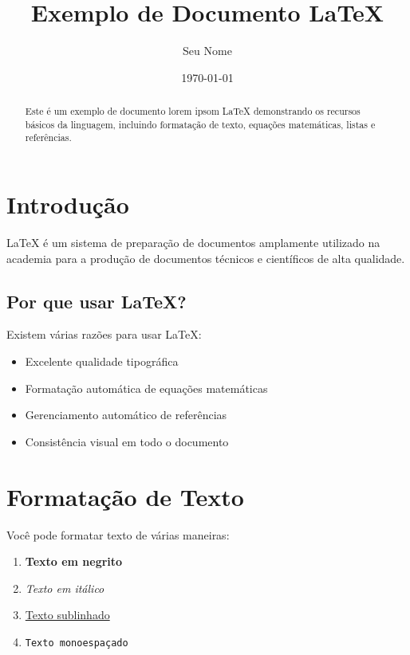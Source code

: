 \documentclass[12pt, a4paper]{article}
\title{Exemplo de Documento \LaTeX}
\author{Seu Nome}
\date{\today}
\begin{document}
\maketitle

\begin{abstract}
Este é um exemplo de documento lorem ipsom \LaTeX{} demonstrando os recursos básicos da linguagem, incluindo formatação de texto, equações matemáticas, listas e referências.
\end{abstract}

\tableofcontents
\newpage

\section{Introdução}

\LaTeX{} é um sistema de preparação de documentos amplamente utilizado na academia para a produção de documentos técnicos e científicos de alta qualidade.

\subsection{Por que usar \LaTeX?}

Existem várias razões para usar \LaTeX:

\begin{itemize}
    \item Excelente qualidade tipográfica
    \item Formatação automática de equações matemáticas
    \item Gerenciamento automático de referências
    \item Consistência visual em todo o documento
\end{itemize}

\section{Formatação de Texto}

Você pode formatar texto de várias maneiras:

\begin{enumerate}
    \item \textbf{Texto em negrito}
    \item \textit{Texto em itálico}
    \item \underline{Texto sublinhado}
    \item \texttt{Texto monoespaçado}
\end{enumerate}
\end{document}
